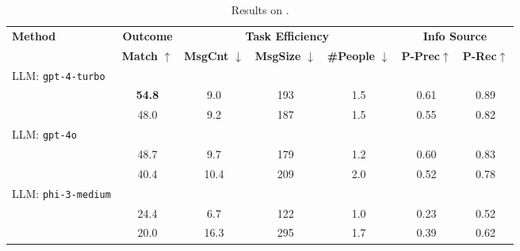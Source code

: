 

\begin{table*}[t!]
\footnotesize
\centering
\begin{tabular}{lcccccc}
\toprule
\multirow{2}{*}{\textbf{Method}} & \multicolumn{1}{c}{\textbf{Outcome}} & \multicolumn{3}{c}{\textbf{Task Efficiency}} & \multicolumn{2}{c}{\textbf{Info Source}} \\
\cmidrule(r{4pt}){2-2}
\cmidrule{3-5}
\cmidrule(l{4pt}){6-7}
      & \textbf{Match} $\uparrow$ & \textbf{MsgCnt} $\downarrow$ & \textbf{MsgSize} $\downarrow$ & \textbf{\#People} $\downarrow$ & \textbf{P-Prec}$\uparrow$ & \textbf{P-Rec}$\uparrow$ \\
\midrule
LLM: \texttt{gpt-4-turbo}    &           &   &          &   &          & \\ 
\textbf{\reactagent{}}      &  \bf 54.8  &        9.0   & 193  & 1.5   &  0.61  &  0.89         \\
\textbf{\noreflectionagent{}}     &  48.0  &   9.2        &  187  &   1.5 &  0.55    &  0.82      \\

\midrule
LLM: \texttt{gpt-4o}     &    &   &          & & & \\ 
\textbf{\reactagent{}}         &  48.7         & 9.7  &    179    & 1.2  &    0.60      &   0.83   \\
\textbf{\noreflectionagent{}}   &     40.4      &  10.4  &  209   & 2.0  &    0.52      &  0.78      \\ 
\midrule
LLM: \texttt{phi-3-medium}    &           &   &          &   &          &  \\ 
\textbf{\reactagent{}}    &  24.4         & 6.7  &    122      &  1.0  &       0.23   &  0.52      \\
\textbf{\noreflectionagent{}}               &  20.0 &   16.3 & 295  & 1.7     &  0.39        &   0.62     \\
\bottomrule
\end{tabular}
\caption{Results on \dataspider{}.
}
\label{tab:results-spider}
\end{table*}




